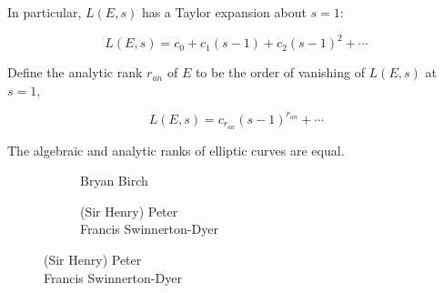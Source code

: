 \begin{frame}[plain]
In particular, $L(E,s)$ has a Taylor expansion about $s=1$: \vspace{0.3cm}

	\[
	L(E,s)= c_0 + c_1 (s-1) + c_2(s-1)^2 + \cdots
	\]  \vspace{0.3cm}
	
Define the analytic rank $r_{an}$ of $E$ to be the order of vanishing of $L(E,s)$ at $s=1$, \vspace{0.3cm}

	\[
	L(E,s)= c_{r_{an}} (s - 1)^{r_{an}} + \cdots
	\] 
\end{frame}



\begin{frame}[plain]

\begin{conj}[BSD]
The algebraic and analytic ranks of elliptic curves are equal.
\end{conj} 
	\begin{figure}[h]
	\centering
	\begin{subfigure}{0.3\textwidth}
	\captionsetup{labelformat=empty}
	\centering
	\caption{Bryan Birch \\ \phantom{x}}
	\end{subfigure}
	\begin{subfigure}{0.6\textwidth}
	\captionsetup{labelformat=empty}
	\centering
	\caption{(Sir Henry) Peter \\ Francis Swinnerton-Dyer}
	\end{subfigure}
	\end{figure} \vspace{0.3cm}


\end{frame}
